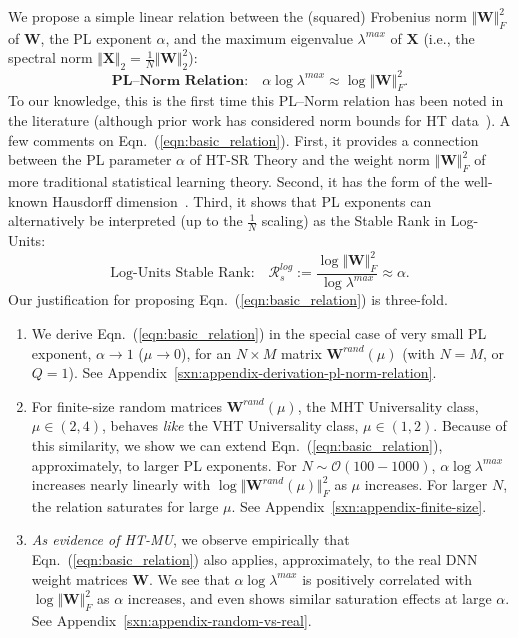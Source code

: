 We propose a simple linear relation between the (squared) Frobenius norm $\Vert\mathbf{W}\Vert^{2}_{F}$ of $\mathbf{W}$, the PL exponent $\alpha$, and the maximum eigenvalue $\lambda^{max}$ of $\mathbf{X}$ (i.e., the spectral norm $\Vert\mathbf{X}\Vert_{2}=\frac{1}{N}\Vert\mathbf{W}\Vert^{2}_{2}$):  
\begin{equation}
\textbf{PL--Norm Relation:} \quad \alpha\log\lambda^{max}\approx\log\Vert\mathbf{W}\Vert^{2}_{F}  .
\label{eqn:basic_relation}
\end{equation}
To our knowledge, this is the first time this PL--Norm relation has been noted in the literature (although prior work has considered norm bounds for HT data~\cite{MN09_TR}).
A few comments on Eqn.~(\ref{eqn:basic_relation}).
First, it provides a connection between the PL parameter $\alpha$ of HT-SR Theory and the weight norm $\Vert\mathbf{W}\Vert^{2}_{F}$ of more traditional statistical learning theory.
Second, it has the form of the well-known Hausdorff dimension~\cite{Sch07}.
Third, it shows that PL exponents can alternatively be interpreted (up to the $\frac{1}{N}$ scaling) as the Stable Rank in Log-Units:
$$
\mbox{Log-Units Stable Rank:} 
\quad
\mathcal{R}^{log}_{s}:=\dfrac{\log\Vert\mathbf{W}\Vert^{2}_{F}}{\log\lambda^{max}}  \approx \alpha  .
$$
Our justification for proposing Eqn.~(\ref{eqn:basic_relation}) is three-fold.
\begin{enumerate}
\item
\label{enum:first}
We derive Eqn.~(\ref{eqn:basic_relation}) in the special case of very small PL exponent, $\alpha \rightarrow 1$ ($\mu\rightarrow 0$), for an $N\times M$ 
matrix $\mathbf{W}^{rand}(\mu)$ (with $N=M$, or $Q=1$).
See Appendix~\ref{sxn:appendix-derivation-pl-norm-relation}.
\item
\label{enum:second}
For finite-size random matrices $\mathbf{W}^{rand}(\mu)$, the MHT Universality class, $\mu\in(2,4)$, behaves \emph{like} the VHT Universality class, $\mu\in(1,2)$.
Because of this similarity, we show we can extend Eqn.~(\ref{eqn:basic_relation}), approximately, to larger PL exponents.
For $N\sim\mathcal{O}(100-1000)$, $\alpha\log\lambda^{max}$ increases nearly linearly with $\log\Vert\mathbf{W}^{rand}(\mu)\Vert^{2}_{F}$ as $\mu$ increases.
For larger $N$, the relation saturates for large $\mu$. 
See Appendix~\ref{sxn:appendix-finite-size}.
\item
\label{enum:third}
\emph{As evidence of HT-MU}, we observe empirically that Eqn.~(\ref{eqn:basic_relation}) also applies, approximately, to the real DNN weight matrices $\mathbf{W}$. 
We see that $\alpha\log\lambda^{max}$ is positively correlated with $\log\Vert\mathbf{W}\Vert^{2}_{F}$ as $\alpha$ increases, and even shows similar saturation effects at large $\alpha$.
See Appendix~\ref{sxn:appendix-random-vs-real}.
\end{enumerate}

